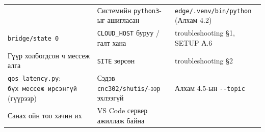 \begin{longtable}[]{@{}lll@{}}
\begin{minipage}[t]{0.30\columnwidth}
\end{minipage} & \begin{minipage}[t]{0.30\columnwidth}\raggedright
Системийн \texttt{python3}-ыг ашигласан\strut
\end{minipage} & \begin{minipage}[t]{0.30\columnwidth}\raggedright
\texttt{edge/\allowbreak{}.\allowbreak{}venv/\allowbreak{}bin/\allowbreak{}python} (Алхам 4.2)\strut
\end{minipage}\tabularnewline
\begin{minipage}[t]{0.30\columnwidth}\raggedright
\texttt{bridge/state\ 0}\strut
\end{minipage} & \begin{minipage}[t]{0.30\columnwidth}\raggedright
\texttt{CLOUD\_HOST} буруу / галт хана\strut
\end{minipage} & \begin{minipage}[t]{0.30\columnwidth}\raggedright
troubleshooting §1, SETUP А.6\strut
\end{minipage}\tabularnewline
\begin{minipage}[t]{0.30\columnwidth}\raggedright
Гүүр холбогдсон ч мессеж алга\strut
\end{minipage} & \begin{minipage}[t]{0.30\columnwidth}\raggedright
\texttt{SITE} зөрсөн\strut
\end{minipage} & \begin{minipage}[t]{0.30\columnwidth}\raggedright
troubleshooting §2\strut
\end{minipage}\tabularnewline
\begin{minipage}[t]{0.30\columnwidth}\raggedright
\texttt{qos\_latency.py}: \texttt{бүх\ мессеж\ ирсэнгүй} (гүүрээр)\strut
\end{minipage} & \begin{minipage}[t]{0.30\columnwidth}\raggedright
Сэдэв \texttt{cnc302/shutis/}-ээр эхлээгүй\strut
\end{minipage} & \begin{minipage}[t]{0.30\columnwidth}\raggedright
Алхам 4.5-ын \texttt{-\/-topic}\strut
\end{minipage}\tabularnewline
\begin{minipage}[t]{0.30\columnwidth}\raggedright
Санах ойн тоо хачин их\strut
\end{minipage} & \begin{minipage}[t]{0.30\columnwidth}\raggedright
VS Code сервер ажиллаж байна\strut
\end{minipage} & \begin{minipage}[t]{0.30\columnwidth}\raggedright

\end{minipage}
\end{longtable}
